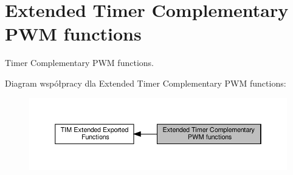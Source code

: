 \hypertarget{group___t_i_m_ex___exported___functions___group3}{}\section{Extended Timer Complementary P\+WM functions}
\label{group___t_i_m_ex___exported___functions___group3}


Timer Complementary P\+WM functions.  


Diagram współpracy dla Extended Timer Complementary P\+WM functions\+:\nopagebreak
\begin{figure}[H]
\begin{center}
\leavevmode
\includegraphics[width=350pt]{group___t_i_m_ex___exported___functions___group3}
\end{center}
\end{figure}
